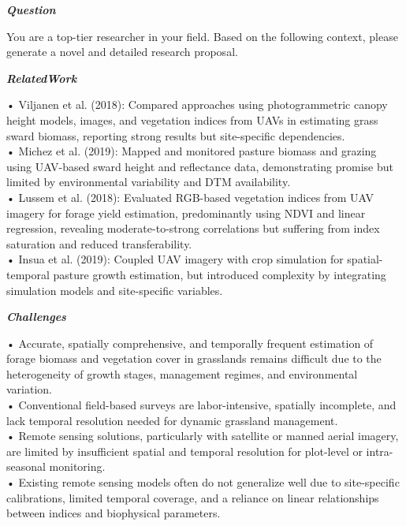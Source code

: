 \begin{tcolorbox}[
    breakable,
    title={Example of Idea Generation in Earth},
    colback=LighterGray,
    colframe=DeepPurple,
    colbacktitle=DeepPurple,
    coltitle=White,
]
\textbf{\emph{\textcolor{DeepPurple}{Question}}}

You are a top-tier researcher in your field. Based on the following context, please generate a novel and detailed research proposal.

\textbf{\emph{\textcolor{CaseOrange}{RelatedWork}}}

• Viljanen et al. (2018): Compared approaches using photogrammetric canopy height models, images, and vegetation indices from UAVs in estimating grass sward biomass, reporting strong results but site-specific dependencies. \\
• Michez et al. (2019): Mapped and monitored pasture biomass and grazing using UAV-based sward height and reflectance data, demonstrating promise but limited by environmental variability and DTM availability. \\
• Lussem et al. (2018): Evaluated RGB-based vegetation indices from UAV imagery for forage yield estimation, predominantly using NDVI and linear regression, revealing moderate-to-strong correlations but suffering from index saturation and reduced transferability. \\
• Insua et al. (2019): Coupled UAV imagery with crop simulation for spatial-temporal pasture growth estimation, but introduced complexity by integrating simulation models and site-specific variables. 

\textbf{\emph{\textcolor{CaseOrange}{Challenges}}}

• Accurate, spatially comprehensive, and temporally frequent estimation of forage biomass and vegetation cover in grasslands remains difficult due to the heterogeneity of growth stages, management regimes, and environmental variation. \\
• Conventional field-based surveys are labor-intensive, spatially incomplete, and lack temporal resolution needed for dynamic grassland management. \\
• Remote sensing solutions, particularly with satellite or manned aerial imagery, are limited by insufficient spatial and temporal resolution for plot-level or intra-seasonal monitoring. \\
• Existing remote sensing models often do not generalize well due to site-specific calibrations, limited temporal coverage, and a reliance on linear relationships between indices and biophysical parameters. 


\end{tcolorbox}
